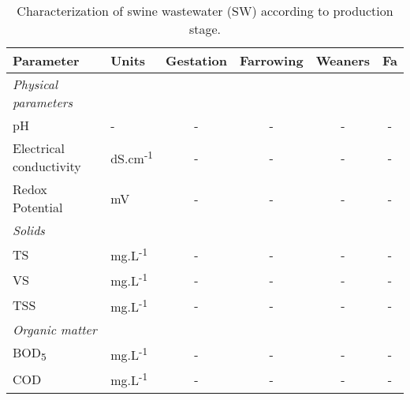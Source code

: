 \begin{table}[]
\centering
\caption{Characterization of swine wastewater (SW) according to production stage.}
\label{table3}
\begin{tabular}{llcccc}
\hline
\textbf{Parameter}      & \textbf{Units}             & \textbf{Gestation} & \textbf{Farrowing} & \textbf{Weaners} & \textbf{Fa} \\ \hline \textit{Physical parameters} \\
pH                      & -      & -                                      & -                                      & -                                    & -                                      \\
Electrical conductivity & dS.cm\textsuperscript{-1} & -                                      & -                                      & -                                    & -                                      \\
Redox Potential         & mV                           & -                                      & -                                      & -                                    & -                                      \\ 
\textit{Solids} \\
TS  & mg.L\textsuperscript{-1}                           & -                                      & -                                      & -                                    & -                                      \\
VS  & mg.L\textsuperscript{-1}                           & -                                      & -                                      & -                                    & -                                      \\ 
TSS  & mg.L\textsuperscript{-1}                           & -                                      & -                                      & -                                    & -                                       \\ 
\textit{Organic matter} \\
BOD\textsubscript{5}                    & mg.L\textsuperscript{-1}                           & -                                      & -                                      & -                                    & -                                      \\
COD                     & mg.L\textsuperscript{-1}                           & -                                      & -                                      & -                                    & -                                      \\

\end{tabular}
\end{table}
